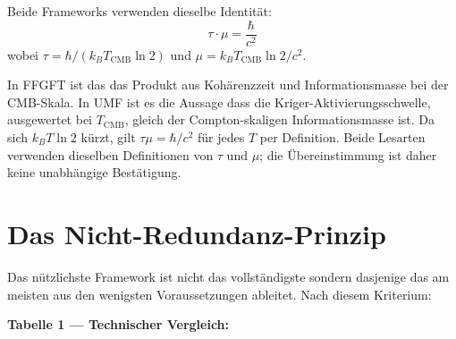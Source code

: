 Beide Frameworks verwenden dieselbe Identität:
\begin{equation}
  \tau \cdot \mu = \frac{\hbar}{c^2}
  \tag{244.7}
\end{equation}
wobei $\tau = \hbar/(k_B T_\text{CMB}\ln 2)$ und $\mu = k_B T_\text{CMB}\ln 2/c^2$.

In FFGFT ist das das Produkt aus Kohärenzzeit und Informationsmasse bei der
CMB-Skala. In UMF ist es die Aussage dass die Kriger-Aktivierungsschwelle,
ausgewertet bei $T_\text{CMB}$, gleich der Compton-skaligen Informationsmasse
ist. Da sich $k_BT\ln2$ kürzt, gilt $\tau\mu = \hbar/c^2$ für jedes $T$ per
Definition. Beide Lesarten verwenden dieselben Definitionen von $\tau$ und
$\mu$; die Übereinstimmung ist daher keine unabhängige Bestätigung.

\section{Das Nicht-Redundanz-Prinzip}

Das nützlichste Framework ist nicht das vollständigste sondern dasjenige das
am meisten aus den wenigsten Voraussetzungen ableitet. Nach diesem Kriterium:

\textbf{Tabelle 1 — Technischer Vergleich:}

\begin{center}
\renewcommand{\arraystretch}{1.4}
{\small
{}
}
\end{center}

